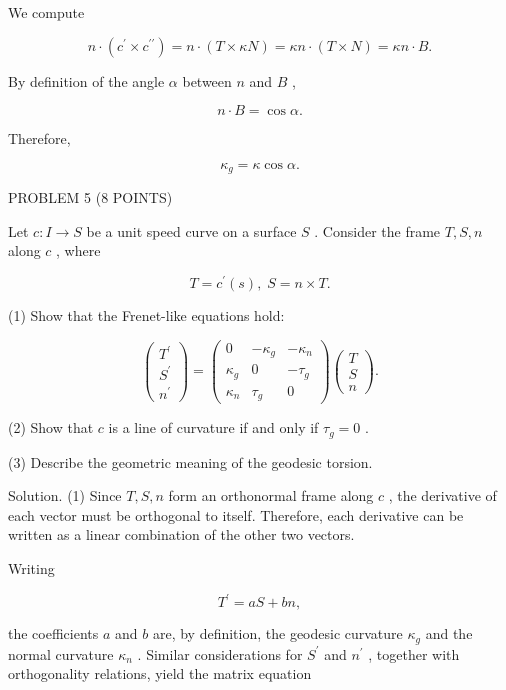 \documentclass[10pt]{article}
\begin{document}
We compute

\[
n \cdot  \left( {{c}^{\prime } \times  {c}^{\prime \prime }}\right)  = n \cdot  \left( {T \times  {\kappa N}}\right)  = {\kappa n} \cdot  \left( {T \times  N}\right)  = {\kappa n} \cdot  B.
\]

By definition of the angle \(\alpha\) between \(n\) and \(B\) ,

\[
n \cdot  B = \cos \alpha .
\]

Therefore,

\[
{\kappa }_{g} = \kappa \cos \alpha .
\]

PROBLEM 5 (8 POINTS)

Let \(c : I \rightarrow  S\) be a unit speed curve on a surface \(S\) . Consider the frame \(T,S,n\) along \(c\) , where

\[
T = {c}^{\prime }\left( s\right) ,\;S = n \times  T.
\]

(1) Show that the Frenet-like equations hold:

\[
\left( \begin{array}{l} {T}^{\prime } \\  {S}^{\prime } \\  {n}^{\prime } \end{array}\right)  = \left( \begin{matrix} 0 &  - {\kappa }_{g} &  - {\kappa }_{n} \\  {\kappa }_{g} & 0 &  - {\tau }_{g} \\  {\kappa }_{n} & {\tau }_{g} & 0 \end{matrix}\right) \left( \begin{array}{l} T \\  S \\  n \end{array}\right) .
\]

(2) Show that \(c\) is a line of curvature if and only if \({\tau }_{g} = 0\) .

(3) Describe the geometric meaning of the geodesic torsion.

Solution. (1) Since \(T,S,n\) form an orthonormal frame along \(c\) , the derivative of each vector must be orthogonal to itself. Therefore, each derivative can be written as a linear combination of the other two vectors.

Writing

\[
{T}^{\prime } = {aS} + {bn},
\]

the coefficients \(a\) and \(b\) are, by definition, the geodesic curvature \({\kappa }_{g}\) and the normal curvature \({\kappa }_{n}\) . Similar considerations for \({S}^{\prime }\) and \({n}^{\prime }\) , together with orthogonality relations, yield the matrix equation
\end{document}
